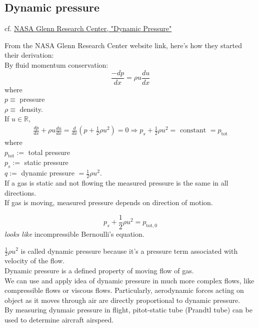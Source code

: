 \documentclass[10pt]{amsart}
\begin{document}
\begin{multicols*}{2}
\section{Dynamic pressure}

cf. \href{https://www.grc.nasa.gov/WWW/K-12/airplane/dynpress.html}{NASA Glenn Research Center, "Dynamic Pressure"}

From the NASA Glenn Research Center website link, here's how they started their derivation: \\
By fluid momentum conservation:
\begin{equation}
\frac{-dp}{dx} = \rho u \frac{du}{dx}
\end{equation} 
where \\
$p\equiv $ pressure \\
$\rho \equiv$ density. \\

If $u \in \mathbb{R}$, 
\[
\begin{gathered}
	\frac{dp}{dx} + \rho u \frac{du}{dx} = \frac{d}{dx} (p + \frac{1}{2} \rho u^2 ) = 0 \Longrightarrow p_s + \frac{1}{2} \rho u^2 = \text{ constant } = p_{\text{tot}}
\end{gathered}
\]
where \\
$p_{\text{tot}} := $ total pressure \\
$p_s := $ static pressure \\
$q := $ dynamic pressure $= \frac{1}{2} \rho u^2$. \\

If a gas is static and not flowing the measured pressure is the same in all directions. \\
If gas is moving, measured pressure depends on direction of motion. 

\begin{equation}
p_s + \frac{1}{2} \rho u^2 = p_{\text{tot}, 0}
\end{equation}
\emph{looks like} incompressible Bernoulli's equation.

$\frac{1}{2} \rho u^2$ is called dynamic pressure because it's a pressure term associated with velocity of the flow. \\
Dynamic pressure is a defined property of moving flow of gas. \\
We can use and apply idea of dynamic pressure in much more complex flows, like compressible flows or viscous flows. Particularly, aerodynamic forces acting on object as it moves through air are directly proportional to dynamic pressure. \\
By measuring dynmaic pressure in flight, pitot-static tube (Prandtl tube) can be used to determine aircraft airspeed.


\end{multicols*}
\end{document}

